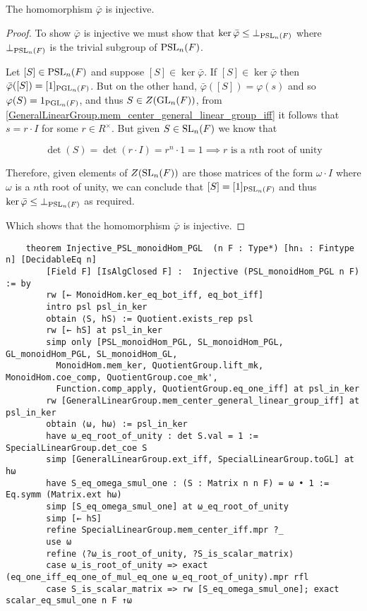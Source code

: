 \begin{lemma}
\label{Injective_PSL_monoidHom_PGL}
\leanok
    The homomorphism $\bar{\varphi}$ is injective.
\end{lemma}
\begin{proof}
\leanok

To show $\bar{\varphi}$ is injective we must show that $\ker \bar{\varphi} \leq \bot_{\operatorname{PSL}_n(F)}$ where $\bot_{\operatorname{PSL}_n(F)}$ is the trivial subgroup of $\operatorname{PSL}_n(F)$.

Let $[S] \in \operatorname{PSL}_n(F)$ and suppose $[S] \in \ker \bar{\varphi}$. If $[S] \in \ker \bar{\varphi}$ then $\bar{\varphi} ([S]) = [1]_{\operatorname{PGL}_n(F)}$. But on the other hand, $\bar{\varphi} ([S]) = \varphi(s)$ and so $\varphi(S) = 1_{\operatorname{PGL}_n(F)}$, 
and thus $S \in Z(\operatorname{GL}_n(F))$, from \ref{GeneralLinearGroup.mem_center_general_linear_group_iff} it follows that $s = r \cdot I$ for some $r \in R^\times$. But given $S \in \operatorname{SL}_n(F)$ we know that 

\begin{equation*}
    \det(S) = \det(r \cdot I) = r^n \cdot 1 = 1 \implies \text{$r$ is a $n$th root of unity}
\end{equation*}

Therefore, given elements of $Z(\operatorname{SL}_n(F))$ are those matrices of the form $\omega \cdot I$ where $\omega$ is a $n$th root of unity, we can conclude that $[S] = [1]_{\operatorname{PSL}_n(F)}$ and thus $\ker \bar{\varphi} \leq \bot_{\operatorname{PSL}_n(F)}$ as required.

Which shows that the homomorphism $\bar{\varphi}$ is injective.
\end{proof}
\begin{footnotesize}
    \begin{verbatim}
    theorem Injective_PSL_monoidHom_PGL  (n F : Type*) [hn₁ : Fintype n] [DecidableEq n]
        [Field F] [IsAlgClosed F] :  Injective (PSL_monoidHom_PGL n F) := by
        rw [← MonoidHom.ker_eq_bot_iff, eq_bot_iff]
        intro psl psl_in_ker
        obtain ⟨S, hS⟩ := Quotient.exists_rep psl
        rw [← hS] at psl_in_ker
        simp only [PSL_monoidHom_PGL, SL_monoidHom_PGL, GL_monoidHom_PGL, SL_monoidHom_GL,
          MonoidHom.mem_ker, QuotientGroup.lift_mk, MonoidHom.coe_comp, QuotientGroup.coe_mk',
          Function.comp_apply, QuotientGroup.eq_one_iff] at psl_in_ker
        rw [GeneralLinearGroup.mem_center_general_linear_group_iff] at psl_in_ker
        obtain ⟨ω, hω⟩ := psl_in_ker
        have ω_eq_root_of_unity : det S.val = 1 := SpecialLinearGroup.det_coe S
        simp [GeneralLinearGroup.ext_iff, SpecialLinearGroup.toGL] at hω
        have S_eq_omega_smul_one : (S : Matrix n n F) = ω • 1 := Eq.symm (Matrix.ext hω)
        simp [S_eq_omega_smul_one] at ω_eq_root_of_unity
        simp [← hS]
        refine SpecialLinearGroup.mem_center_iff.mpr ?_
        use ω
        refine ⟨?ω_is_root_of_unity, ?S_is_scalar_matrix⟩
        case ω_is_root_of_unity => exact (eq_one_iff_eq_one_of_mul_eq_one ω_eq_root_of_unity).mpr rfl
        case S_is_scalar_matrix => rw [S_eq_omega_smul_one]; exact scalar_eq_smul_one n F ↑ω
    \end{verbatim}
    \end{footnotesize}
    
